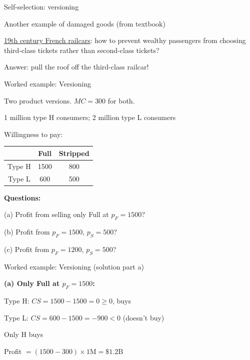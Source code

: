 \documentclass[notes,11pt, aspectratio=169]{beamer}
\newenvironment{wideitemize}{\itemize\addtolength{\itemsep}{10pt}}{\enditemize}
\begin{document}
\begin{frame}{Self-selection: versioning}
	\begin{wideitemize}
		\item Another example of damaged goods (from textbook)
		\item \underline{19th century French railcars}: how to prevent wealthy passengers from choosing third-class tickets rather than second-class tickets? \pause
		\item Answer: pull the roof off the third-class railcar!
	\end{wideitemize}
\end{frame}

\begin{frame}{Worked example: Versioning}
	\begin{wideitemize}
		\item Two product versions. $MC = 300$ for both.
		\item 1 million type H consumers; 2 million type L consumers
		\item Willingness to pay:
		\begin{center}
			\begin{tabular}{|c|c|c|}
				\hline
				& Full & Stripped \\
				\hline
				Type H & 1500 & 800 \\
				Type L & 600 & 500 \\
				\hline
			\end{tabular}
		\end{center}
		\item \textbf{Questions:}
		\item (a) Profit from selling only Full at $p_F = 1500$?
		\item (b) Profit from $p_F = 1500$, $p_S = 500$?
		\item (c) Profit from $p_F = 1200$, $p_S = 500$?
	\end{wideitemize}
\end{frame}

\begin{frame}{Worked example: Versioning (solution part a)}
	\begin{wideitemize}
		\item \textbf{(a) Only Full at $p_F = 1500$:}
		\begin{wideitemize}
			\vspace{5pt}
			\item Type H: $CS = 1500 - 1500 = 0 \geq 0$, buys
			\item Type L: $CS = 600 - 1500 = -900 < 0$ (doesn't buy)
		\end{wideitemize}
		\item Only H buys
		\item Profit $= (1500 - 300) \times 1\text{M} = \$1.2\text{B}$
	\end{wideitemize}
\end{frame}
\end{document}
